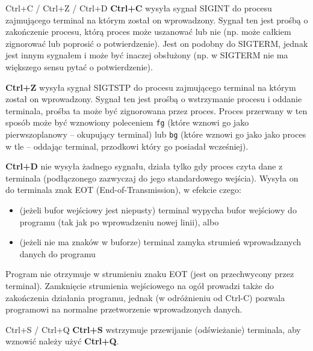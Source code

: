 \documentclass{pdfBooklets}
\begin{document}
\begin{ProTip}{Ctrl+C / Ctrl+Z / Ctrl+D}
\textbf{Ctrl+C} wysyła sygnał SIGINT do procesu zajmującego terminal na którym został on wprowadzony. Sygnał ten jest prośbą o zakończenie procesu, którą proces może uszanować lub nie (np. może całkiem zignorować lub poprosić o potwierdzenie). Jest on podobny do SIGTERM, jednak jest innym sygnałem i może być inaczej obsłużony (np. w SIGTERM nie ma większego sensu pytać o potwierdzenie).

\vspace{6pt}\textbf{Ctrl+Z} wysyła sygnał SIGTSTP do procesu zajmującego terminal na którym został on wprowadzony. Sygnał ten jest prośbą o wstrzymanie procesu i oddanie terminala, prośba ta może być zignorowana przez proces. Proces przerwany w ten sposób może być wznowiony poleceniem \Verb#fg# (które wznowi go jako pierwszoplanowy – okupujący terminal) lub \Verb#bg# (które wznowi go jako jako proces w tle – oddając terminal, przodkowi który go posiadał wcześniej).

\vspace{6pt}\textbf{Ctrl+D} nie wysyła żadnego sygnału, działa tylko gdy proces czyta dane z terminala (podłączonego zazwyczaj do jego standardowego wejścia). Wysyła on do terminala znak EOT (End-of-Transmission), w efekcie czego:
\begin{itemize}
	\item (jeżeli bufor wejściowy jest niepusty) terminal wypycha bufor wejściowy do programu (tak jak po wprowadzeniu nowej linii), albo
	\item (jeżeli nie ma znaków w buforze) terminal zamyka strumień wprowadzanych danych do programu
\end{itemize}
Program nie otrzymuje w strumieniu znaku EOT (jest on przechwycony przez terminal).
Zamknięcie strumienia wejściowego na ogół prowadzi także do zakończenia działania programu, jednak (w odróżnieniu od Ctrl-C) pozwala programowi na normalne przetworzenie wprowadzonych danych.
\end{ProTip}

\begin{ProTip}{Ctrl+S / Ctrl+Q}
\textbf{Ctrl+S} wstrzymuje przewijanie (odświeżanie) terminala, aby wznowić należy użyć \textbf{Ctrl+Q}.
\end{ProTip}

\end{document}
